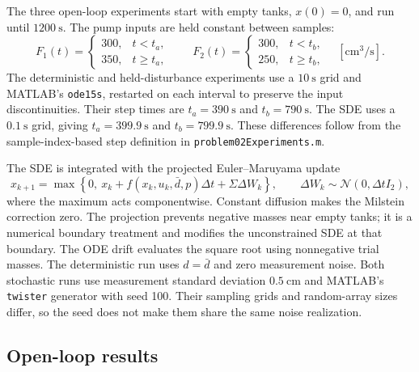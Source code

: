 The three open-loop experiments start with empty tanks, $x(0)=0$, and run
until $1200\ \mathrm{s}$. The pump inputs are held constant between samples:
\begin{equation}
 F_1(t)=\begin{cases}300,&t<t_a,\\350,&t\geq t_a,\end{cases}
 \qquad
 F_2(t)=\begin{cases}300,&t<t_b,\\250,&t\geq t_b,\end{cases}
 \quad [\mathrm{cm^3/s}].
\end{equation}
The deterministic and held-disturbance experiments use a $10\ \mathrm{s}$
grid and MATLAB's \texttt{ode15s}, restarted on each interval to preserve
the input discontinuities. Their step times are $t_a=390\ \mathrm{s}$ and
$t_b=790\ \mathrm{s}$. The SDE uses a $0.1\ \mathrm{s}$ grid, giving
$t_a=399.9\ \mathrm{s}$ and $t_b=799.9\ \mathrm{s}$. These differences
follow from the sample-index-based step definition in
\texttt{problem02Experiments.m}.

The SDE is integrated with the projected Euler--Maruyama update
\begin{equation}
 x_{k+1}=\max\left\{0,\ x_k+f(x_k,u_k,\bar d,p)\Delta t
                    +\Sigma\Delta W_k\right\},\qquad
 \Delta W_k\sim\mathcal N(0,\Delta t I_2),
\end{equation}
where the maximum acts componentwise. Constant diffusion makes the
Milstein correction zero. The projection prevents negative masses near
empty tanks; it is a numerical boundary treatment and modifies the
unconstrained SDE at that boundary. The ODE drift evaluates the square root
using nonnegative trial masses. The deterministic run uses $d=\bar d$ and
zero measurement noise. Both stochastic runs use measurement standard
deviation $0.5\ \mathrm{cm}$ and MATLAB's \texttt{twister} generator with
seed 100. Their sampling grids and random-array sizes differ, so the seed
does not make them share the same noise realization.

\subsection{Open-loop results}

